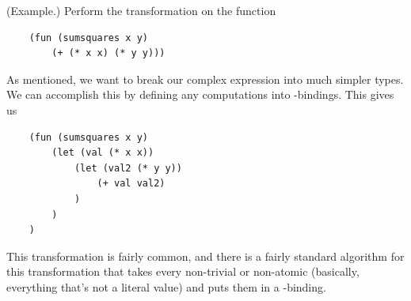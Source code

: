 \begin{mdframed}
    (Example.) Perform the transformation on the function 
    \begin{verbatim}
    (fun (sumsquares x y)
        (+ (* x x) (* y y)))\end{verbatim}

    \begin{mdframed}
        As mentioned, we want to break our complex expression into much simpler types. We can accomplish this by defining any computations into -bindings. This gives us 
        \begin{verbatim}
    (fun (sumsquares x y)
        (let (val (* x x))
            (let (val2 (* y y))
                (+ val val2)
            )
        )
    )\end{verbatim}
    \end{mdframed}
\end{mdframed}
This transformation is fairly common, and there is a fairly standard algorithm for this transformation that takes every non-trivial or non-atomic (basically, everything that's not a literal value) and puts them in a -binding. 

